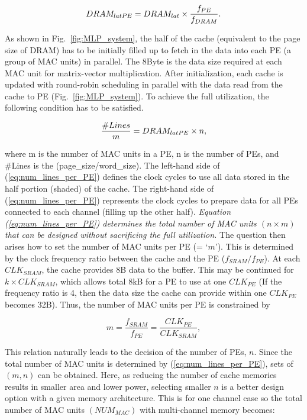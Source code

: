 \documentclass[pageno]{jpaper}
\begin{document}
\begin{equation}
	DRAM_{lat\-PE} = DRAM_{lat} \times \frac{f_{PE}}{f_{DRAM}}.
	\label{eq:DRAM_LAT_PE}
\end{equation}

As shown in Fig.~\ref{fig:MLP_system}, the half of the cache (equivalent to the page size of DRAM) has to be initially filled up to fetch in the data into each PE (a group of MAC units) in parallel. The 8Byte is the data size required at each MAC unit for matrix-vector multiplication. After initialization, each cache is updated with round-robin scheduling in parallel with the data read from the cache to PE (Fig.~\ref{fig:MLP_system}). To achieve the full utilization, the following condition has to be satisfied.

\begin{equation}
	\frac{\#Lines}{m}=DRAM_{lat\-PE}\times n,
	\label{eq:num_lines_per_PE}
\end{equation}

where m is the number of MAC units in a PE, n is the number of PEs, and \#Lines is the (page\_size/word\_size). The left-hand side of (\ref{eq:num_lines_per_PE}) defines the clock cycles to use all data stored in the half portion (shaded) of the cache. The right-hand side of (\ref{eq:num_lines_per_PE}) represents the clock cycles to prepare data for all PEs connected to each channel (filling up the other half).\textit{ Equation (\ref{eq:num_lines_per_PE}) determines the total number of MAC units \begin{math}(n\times m)\end{math} that can be designed without sacrificing the full utilization.} The question then arises how to set the number of MAC units per PE (= $‘m’$). This is determined by the clock frequency ratio between the cache and the PE ($f_{SRAM}/ f_{PE}$). At each $CLK_{SRAM}$, the cache provides 8B data to the buffer. This may be continued for $k\times CLK_{SRAM}$, which allows total 8kB for a PE to use at one $CLK_{PE}$ (If the frequency ratio is 4, then the data size the cache can provide within one $CLK_{PE}$ becomes 32B). Thus, the number of MAC units per PE is constrained by

\begin{equation}
	m=\frac{f_{SRAM}}{f_{PE}}=\frac{CLK_{PE}}{CLK_{SRAM}},
	\label{eq:num_m}
\end{equation}

This relation naturally leads to the decision of the number of PEs, $n$. Since the total number of MAC units is determined by (\ref{eq:num_lines_per_PE}), sets of $(m, n)$ can be obtained. Here, as reducing the number of cache memories results in smaller area and lower power, selecting smaller $n$ is a better design option with a given memory architecture. This is for one channel case so the total number of MAC units $(NUM_{MAC})$ with multi-channel memory becomes:
\end{document}
